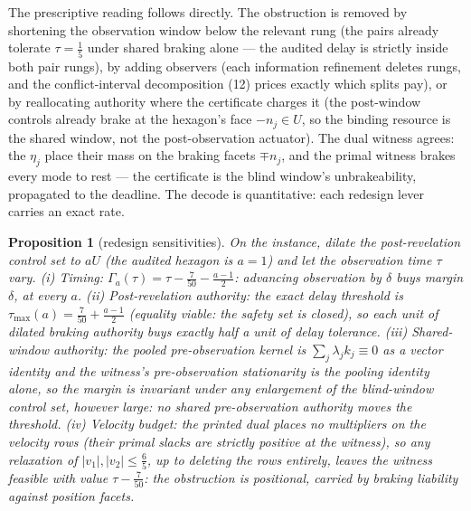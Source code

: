 \documentclass[10pt,twocolumn]{article}
\theoremstyle{plain}
\newtheorem{proposition}[theorem]{Proposition}
\theoremstyle{definition}
\theoremstyle{remark}
\begin{document}
The prescriptive reading follows directly. The obstruction is removed by
shortening the observation window below the relevant rung (the pairs
already tolerate \(\tau = \tfrac15\) under shared braking alone ---
the audited delay is strictly inside both pair rungs), by adding
observers (each information refinement deletes rungs, and the
conflict-interval decomposition (12) prices exactly which splits pay), or
by reallocating authority where the certificate charges it (the post-window
controls already brake at the hexagon's face \(-n_j \in U\), so the
binding resource is the shared window, not the post-observation actuator).
The dual witness agrees: the \(\eta_j\) place their mass on the braking
facets \(\mp n_j\), and the primal witness brakes every mode to rest ---
the certificate is the blind window's unbrakeability, propagated to the
deadline. The decode is quantitative: each redesign lever carries an exact
rate.

\begin{proposition}[redesign sensitivities]\label{lp-prop:redesign}
On the instance, dilate the post-revelation control set to \(aU\) (the
audited hexagon is \(a = 1\)) and let the observation time \(\tau\)
vary. \emph{(i) Timing:} \(\Gamma_a(\tau) = \tau - \tfrac7{50} -
\tfrac{a-1}{2}\): advancing observation by \(\delta\) buys margin
\(\delta\), at every \(a\). \emph{(ii) Post-revelation authority:}
the exact delay threshold is \(\tau_{\max}(a) = \tfrac7{50} +
\tfrac{a-1}{2}\) (equality viable: the safety set is closed), so each
unit of dilated braking authority buys exactly half a unit of delay
tolerance. \emph{(iii) Shared-window authority:} the pooled
pre-observation kernel is \(\sum_j \lambda_j k_j \equiv 0\) as a
vector identity and the witness's pre-observation stationarity is the
pooling identity alone, so the margin is invariant under \emph{any}
enlargement of the blind-window control set, however large: no shared
pre-observation authority moves the threshold. \emph{(iv) Velocity
budget:} the printed dual places no multipliers on the velocity rows
(their primal slacks are strictly positive at the witness), so any
relaxation of \(|v_1|, |v_2| \le \tfrac65\), up to deleting the rows
entirely, leaves the witness feasible with value \(\tau -
\tfrac7{50}\): the obstruction is positional, carried by braking
liability against position facets.
\end{proposition}
\end{document}
